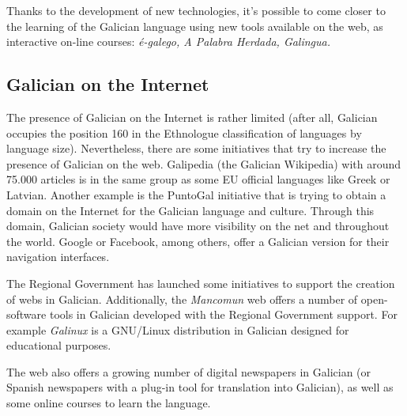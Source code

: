 \begin{multicols}{2}
\begin{itemize}
\begin{multicols}{2}
Thanks to the development of new technologies, it's possible to come closer to the learning of the Galician language using new tools available on the web, as interactive on-line courses:  \textit{é-galego,  A Palabra Herdada, Galingua.}

\subsection{Galician on the Internet}

   The presence of Galician on the Internet is rather limited (after all, Galician occupies the position 160 in the Ethnologue \cite{GAL-Nota16} classification of languages by language size). Nevertheless, there are some initiatives that try to increase the presence of Galician on the web. Galipedia \cite{GAL-Nota17} (the Galician Wikipedia) with around 75.000 articles is in the same group as some EU official languages like Greek or Latvian.  Another example is the PuntoGal \cite{GAL-Nota18} initiative that is trying to obtain a domain on the Internet for the Galician language and culture. Through this domain, Galician society would have more visibility on the net and throughout the world.  Google or Facebook, among others, offer a Galician version for their navigation interfaces.

The Regional Government has launched some initiatives to support the creation of webs in Galician. Additionally, the \textit{Mancomun} \cite{GAL-Nota19} web offers a number of open-software tools in Galician developed with the Regional Government support. For example \textit{Galinux} \cite{GAL-Nota20} is a GNU/Linux distribution in Galician designed for educational purposes.

The web also offers a growing number of digital newspapers in Galician (or Spanish newspapers with a plug-in tool for translation into Galician), as well as some online courses to learn the language. 
 

\end{multicols}

\clearpage



\begin{multicols}{2}


\end{multicols}
\end{itemize}
\end{multicols}
